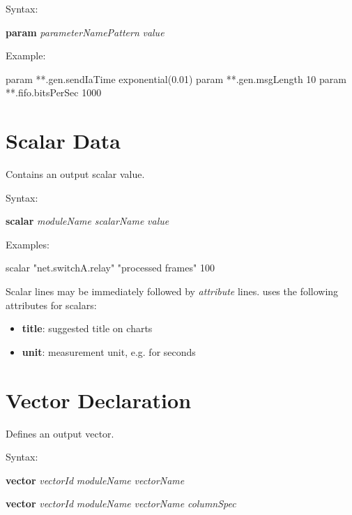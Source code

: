 Syntax:

\hspace{20mm} \textbf{param} \textit{parameterNamePattern} \textit{value}

Example:

\begin{filelisting}
param **.gen.sendIaTime  exponential(0.01)
param **.gen.msgLength   10
param **.fifo.bitsPerSec 1000
\end{filelisting}


\section{Scalar Data}
\label{sec:result-file-formats:scalar-data}

Contains an output scalar value.

Syntax:

\hspace{20mm} \textbf{scalar} \textit{moduleName} \textit{scalarName} \textit{value}

Examples:

\begin{filelisting}
scalar "net.switchA.relay" "processed frames" 100
\end{filelisting}

Scalar lines may be immediately followed by \textit{attribute} lines.
{\opp} uses the following attributes for scalars:

\begin{itemize}
    \item \textbf{title}: suggested title on charts
    \item \textbf{unit}: measurement unit, e.g.  for seconds
\end{itemize}



\section{Vector Declaration}
\label{sec:result-file-formats:vector-declaration}

Defines an output vector.

Syntax:

\hspace{20mm} \textbf{vector} \textit{vectorId} \textit{moduleName} \textit{vectorName}

\hspace{20mm} \textbf{vector} \textit{vectorId} \textit{moduleName} \textit{vectorName} \textit{columnSpec}

